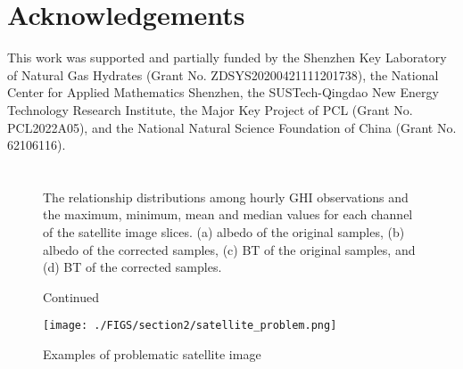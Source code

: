 \documentclass[review]{elsarticle}
\begin{document}
\section*{Acknowledgements}
This work was supported and partially funded by the Shenzhen Key Laboratory of Natural Gas Hydrates (Grant No. ZDSYS20200421111201738), the National Center for Applied Mathematics Shenzhen, the SUSTech-Qingdao New Energy Technology Research Institute, the Major Key Project of PCL (Grant No. PCL2022A05), and the National Natural Science Foundation of China (Grant No. 62106116).

\appendix
\section{}

\setcounter{table}{0}
\renewcommand{\thetable}{A\arabic{table}}   %

\setcounter{figure}{0}
\renewcommand{\thefigure}{A\arabic{figure}}



\begin{figure}[H]
    \centering
    \caption{The relationship distributions among hourly GHI observations and the maximum, minimum, mean and median values for each channel of the satellite image slices. (a) albedo of the original samples, (b) albedo of the corrected samples, (c) BT of the original samples, and (d) BT of the corrected samples.}
    \label{fig:irrad_Albedo_TBB}
\end{figure}
\begin{figure}[H]
    \centering
    \ContinuedFloat
    \caption{Continued}
\end{figure}
\setcounter{subfigure}{0}

\begin{figure}[H]
    \centering
    \texttt{[image: ./FIGS/section2/satellite\_problem.png]}
    \caption{Examples of problematic satellite image}
    \label{fig:satellite_problem}
\end{figure}












\end{document}
